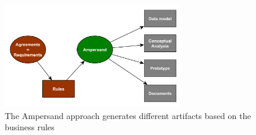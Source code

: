 \begin{figure}[htb]
	\centering
	\includegraphics[width=0.7\textwidth]{Figures/Generation}
	\caption[Generated artifacts]{The Ampersand approach generates different artifacts based on the business rules}
	\label{fig:generation}
\end{figure}

